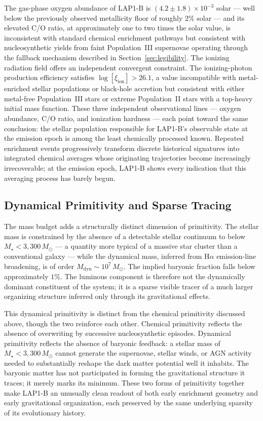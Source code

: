 \documentclass[12pt, a4paper]{article}
\newcommand{\Msun}{M_{\odot}}
\newcommand{\Mstar}{M_{\star}}
\newcommand{\Mdyn}{M_{\mathrm{dyn}}}
\newcommand{\xiion}{\xi_{\mathrm{ion}}}
\theoremstyle{definition}
\begin{document}
The gas-phase oxygen abundance of LAP1-B is $(4.2 \pm 1.8) \times
10^{-3}$ solar --- well below the previously observed metallicity floor of
roughly $2\%$ solar --- and its elevated C/O ratio, at approximately one to
two times the solar value, is inconsistent with standard chemical enrichment
pathways but consistent with nucleosynthetic yields from faint Population~III
supernovae operating through the fallback mechanism described in
Section~\ref{sec:legibility}. The ionizing radiation field offers an
independent convergent constraint. The ionizing-photon production efficiency
satisfies $\log[\xiion] > 26.1$, a value incompatible with metal-enriched
stellar populations or black-hole accretion but consistent with either
metal-free Population~III stars or extreme Population~II stars with a
top-heavy initial mass function. These three independent observational lines
--- oxygen abundance, C/O ratio, and ionization hardness --- each point toward
the same conclusion: the stellar population responsible for LAP1-B's observable
state at the emission epoch is among the least chemically processed known.
Repeated enrichment events progressively transform discrete historical
signatures into integrated chemical averages whose originating trajectories
become increasingly irrecoverable; at the emission epoch, LAP1-B shows every
indication that this averaging process has barely begun.

\subsection{Dynamical Primitivity and Sparse Tracing}

The mass budget adds a structurally distinct dimension of primitivity.
The stellar mass is constrained by the absence of a detectable stellar
continuum to below $\Mstar < 3{,}300\,\Msun$ --- a quantity more typical
of a massive star cluster than a conventional galaxy --- while the dynamical
mass, inferred from H$\alpha$ emission-line broadening, is of order
$\Mdyn \sim 10^{7}\,\Msun$. The implied baryonic fraction falls below
approximately $1\%$. The luminous component is therefore not the dynamically
dominant constituent of the system; it is a sparse visible tracer of a much
larger organizing structure inferred only through its gravitational effects.

This dynamical primitivity is distinct from the chemical primitivity
discussed above, though the two reinforce each other. Chemical primitivity
reflects the absence of overwriting by successive nucleosynthetic episodes.
Dynamical primitivity reflects the absence of baryonic feedback: a stellar
mass of $\Mstar < 3{,}300\,\Msun$ cannot generate the supernovae, stellar
winds, or AGN activity needed to substantially reshape the dark matter
potential well it inhabits. The baryonic matter has not participated in
forming the gravitational structure it traces; it merely marks its minimum.
These two forms of primitivity together make LAP1-B an unusually clean
readout of both early enrichment geometry and early gravitational organization,
each preserved by the same underlying sparsity of its evolutionary history.
\end{document}
